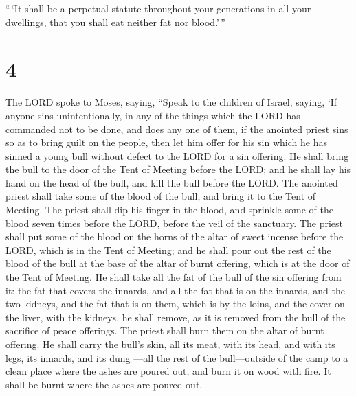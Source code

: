  ``\,`It shall be a perpetual statute throughout your
generations in all your dwellings, that you shall eat neither fat nor
blood.'\,''

\hypertarget{section-3}{%
\section{4}\label{section-3}}

 The LORD spoke to Moses, saying,  ``Speak to
the children of Israel, saying, `If anyone sins unintentionally, in any
of the things which the LORD has commanded not to be done, and does any
one of them,  if the anointed priest sins so as to bring
guilt on the people, then let him offer for his sin which he has sinned
a young bull without defect to the LORD for a sin offering. 
He shall bring the bull to the door of the Tent of Meeting before the
LORD; and he shall lay his hand on the head of the bull, and kill the
bull before the LORD.  The anointed priest shall take some
of the blood of the bull, and bring it to the Tent of Meeting.
 The priest shall dip his finger in the blood, and sprinkle
some of the blood seven times before the LORD, before the veil of the
sanctuary.  The priest shall put some of the blood on the
horns of the altar of sweet incense before the LORD, which is in the
Tent of Meeting; and he shall pour out the rest of the blood of the bull
at the base of the altar of burnt offering, which is at the door of the
Tent of Meeting.  He shall take all the fat of the bull of
the sin offering from it: the fat that covers the innards, and all the
fat that is on the innards,  and the two kidneys, and the
fat that is on them, which is by the loins, and the cover on the liver,
with the kidneys, he shall remove,  as it is removed from
the bull of the sacrifice of peace offerings. The priest shall burn them
on the altar of burnt offering.  He shall carry the bull's
skin, all its meat, with its head, and with its legs, its innards, and
its dung  ---all the rest of the bull---outside of the camp
to a clean place where the ashes are poured out, and burn it on wood
with fire. It shall be burnt where the ashes are poured out.

